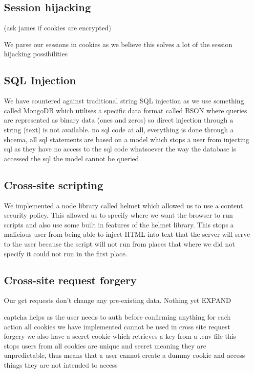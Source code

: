 \documentclass{ueacmpstyle}
\begin{document}
        \subsection{Session hijacking}
        
        (ask james if cookies are encrypted)
        
        We parse our sessions in cookies as we believe this solves a lot of the session hijacking possibilities
        
        \subsection{SQL Injection}
        
        We have countered against traditional string SQL injection as we use something called MongoDB which utilises a specific data format called BSON where queries are represented as binary data (ones and zeros) so direct injection through a string (text) is not available.
        no sql code at all, everything is done through a shcema, all sql statements are based on a model which stops a user from injecting sql as they have no access to the sql code whatsoever
        the way the database is accessed the sql the model cannot be queried 
        
        \subsection{Cross-site scripting}
        
        We implemented a node library called helmet which allowed us to use a content security policy. This allowed us to specify where we want the browser to run scripts and also use some built in features of the helmet library. This stops a malicious user from being able to inject HTML into text that the server will serve to the user because the script will not run from places that where we did not specify it could not run in the first place.
        
        \subsection{Cross-site request forgery }
        
        Our get requests don't change any pre-existing data.
        Nothing yet EXPAND
        
        captcha helps as the user needs to auth before confirming anything for each action
        all cookies we have implemented cannot be used in cross site request forgery
        we also have a secret cookie which retrieves a key from a .env file this stops users from 
        all cookies are unique and secret meaning they are unpredictable, thus means that a user cannot create a dummy cookie and access things they are not intended to access
        
\end{document}
